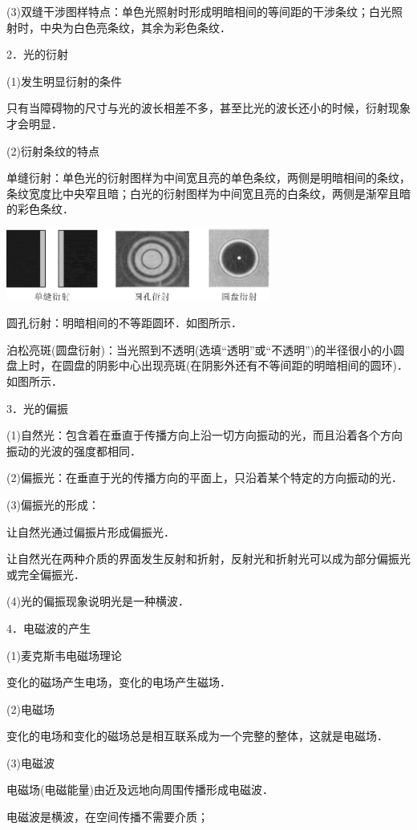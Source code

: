 (3)双缝干涉图样特点：单色光照射时形成明暗相间的等间距的干涉条纹；白光照射时，中央为白色亮条纹，其余为彩色条纹．

2．光的衍射

(1)发生明显衍射的条件

只有当障碍物的尺寸与光的波长相差不多，甚至比光的波长还小的时候，衍射现象才会明显．

(2)衍射条纹的特点

单缝衍射：单色光的衍射图样为中间宽且亮的单色条纹，两侧是明暗相间的条纹，条纹宽度比中央窄且暗；白光的衍射图样为中间宽且亮的白条纹，两侧是渐窄且暗的彩色条纹．

\begin{center}\includegraphics[width=3.41528in,height=0.93403in]{media/image557.png}\end{center}
圆孔衍射：明暗相间的不等距圆环．如图所示．

泊松亮斑(圆盘衍射)：当光照到不透明(选填``透明''或``不透明'')的半径很小的小圆盘上时，在圆盘的阴影中心出现亮斑(在阴影外还有不等间距的明暗相间的圆环)．如图所示．

3．光的偏振

(1)自然光：包含着在垂直于传播方向上沿一切方向振动的光，而且沿着各个方向振动的光波的强度都相同．

(2)偏振光：在垂直于光的传播方向的平面上，只沿着某个特定的方向振动的光．

(3)偏振光的形成：

让自然光通过偏振片形成偏振光．

让自然光在两种介质的界面发生反射和折射，反射光和折射光可以成为部分偏振光或完全偏振光．

(4)光的偏振现象说明光是一种横波．

4．电磁波的产生

(1)麦克斯韦电磁场理论

变化的磁场产生电场，变化的电场产生磁场．

(2)电磁场

变化的电场和变化的磁场总是相互联系成为一个完整的整体，这就是电磁场．

(3)电磁波

电磁场(电磁能量)由近及远地向周围传播形成电磁波．

电磁波是横波，在空间传播不需要介质；

